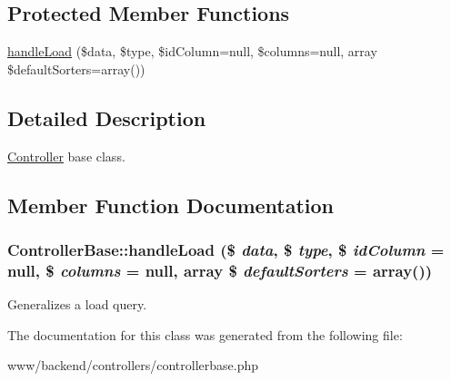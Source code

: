\subsection*{Protected Member Functions}
\begin{DoxyCompactItemize}
\item 
\hyperlink{classControllerBase_a0416073c36aca989ad97cfe7ca20ee68}{handleLoad} (\$data, \$type, \$idColumn=null, \$columns=null, array \$defaultSorters=array())
\end{DoxyCompactItemize}


\subsection{Detailed Description}
\hyperlink{classController}{Controller} base class. 

\subsection{Member Function Documentation}
\hypertarget{classControllerBase_a0416073c36aca989ad97cfe7ca20ee68}{
\subsubsection[{handleLoad}]{\setlength{\rightskip}{0pt plus 5cm}ControllerBase::handleLoad (\$ {\em data}, \/  \$ {\em type}, \/  \$ {\em idColumn} = {\ttfamily null}, \/  \$ {\em columns} = {\ttfamily null}, \/  array \$ {\em defaultSorters} = {\ttfamily array()})}}
\label{classControllerBase_a0416073c36aca989ad97cfe7ca20ee68}
Generalizes a load query. 

The documentation for this class was generated from the following file:\begin{DoxyCompactItemize}
\item 
www/backend/controllers/controllerbase.php\end{DoxyCompactItemize}
